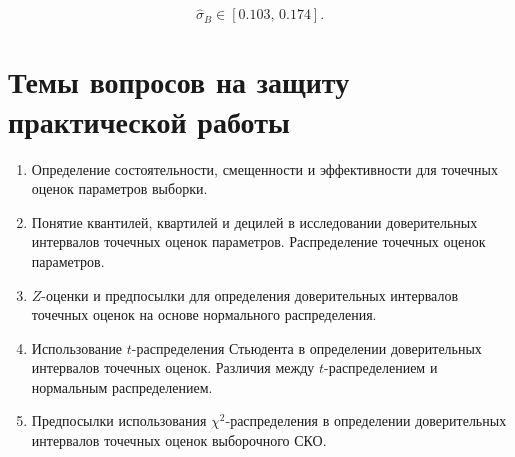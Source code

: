 \documentclass[
]{article}
\begin{document}
\[
\hat{\sigma}_{B} \in \left[ 0.103,\, 0.174 \right].
\]

\hypertarget{ux442ux435ux43cux44b-ux432ux43eux43fux440ux43eux441ux43eux432-ux43dux430-ux437ux430ux449ux438ux442ux443-ux43fux440ux430ux43aux442ux438ux447ux435ux441ux43aux43eux439-ux440ux430ux431ux43eux442ux44b}{%
\section{\texorpdfstring{\textbf{Темы вопросов на защиту практической
работы}}{Темы вопросов на защиту практической работы}}\label{ux442ux435ux43cux44b-ux432ux43eux43fux440ux43eux441ux43eux432-ux43dux430-ux437ux430ux449ux438ux442ux443-ux43fux440ux430ux43aux442ux438ux447ux435ux441ux43aux43eux439-ux440ux430ux431ux43eux442ux44b}}

\begin{enumerate}
\def\labelenumi{\arabic{enumi}.}
\item
  Определение состоятельности, смещенности и эффективности для точечных
  оценок параметров выборки.
\item
  Понятие квантилей, квартилей и децилей в исследовании доверительных
  интервалов точечных оценок параметров. Распределение точечных оценок
  параметров.
\item
  \(Z\)-оценки и предпосылки для определения доверительных интервалов
  точечных оценок на основе нормального распределения.
\item
  Использование \(t\)-распределения Стьюдента в определении
  доверительных интервалов точечных оценок. Различия между
  \(t\)-распределением и нормальным распределением.
\item
  Предпосылки использования \(\chi^2\)-распределения в определении
  доверительных интервалов точечных оценок выборочного СКО.
\end{enumerate}
\end{document}
